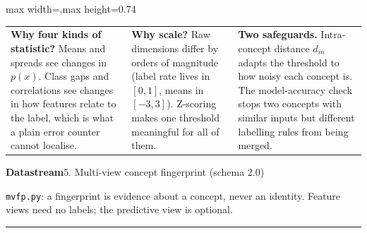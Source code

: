 \documentclass[10pt]{article}
\newcommand{\pagetitle}[2]{%
  {\Huge\bfseries Datastream}\hfill{\large #1}\par\vspace{2pt}
  {\large\color{ink!70} #2}\par\vspace{8pt}\hrule\vspace{14pt}}
\begin{document}
\begin{center}
\begin{adjustbox}{max width=\textwidth,max height=0.74\textheight}
\end{adjustbox}
\end{center}
\vfill
\begin{tabular}{@{}p{12cm}p{12cm}p{12cm}@{}}
\textbf{Why four kinds of statistic?} Means and spreads see changes in $p(x)$. Class gaps and correlations see changes in how features relate to the label, which is what a plain error counter cannot localise. &
\textbf{Why scale?} Raw dimensions differ by orders of magnitude (label rate lives in $[0,1]$, means in $[-3,3]$). Z-scoring makes one threshold meaningful for all of them. &
\textbf{Two safeguards.} Intra-concept distance $d_{in}$ adapts the threshold to how noisy each concept is. The model-accuracy check stops two concepts with similar inputs but different labelling rules from being merged.
\end{tabular}
\clearpage

\pagetitle{5. Multi-view concept fingerprint (schema 2.0)}{\texttt{mvfp.py}: a fingerprint is evidence about a concept, never an identity. Feature views need no labels; the predictive view is optional.}
\end{document}
